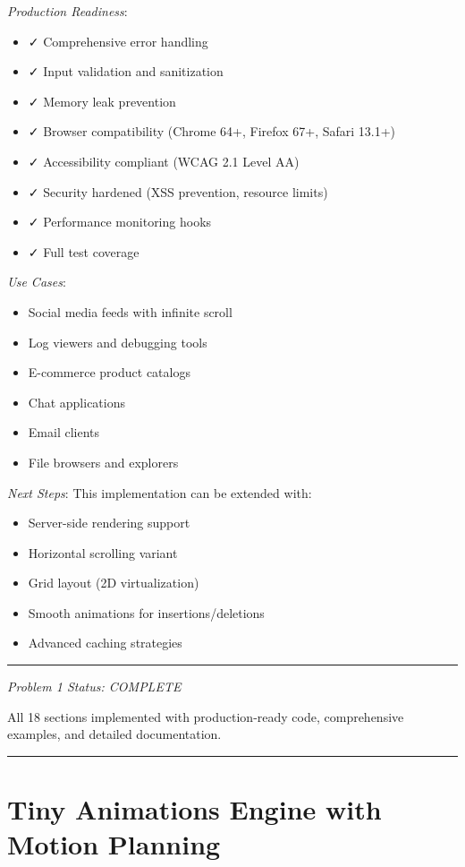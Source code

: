 \documentclass[11pt]{article}
\begin{document}
\emph{Production Readiness}:
\begin{itemize}
\item ✓ Comprehensive error handling
\item ✓ Input validation and sanitization
\item ✓ Memory leak prevention
\item ✓ Browser compatibility (Chrome 64+, Firefox 67+, Safari 13.1+)
\item ✓ Accessibility compliant (WCAG 2.1 Level AA)
\item ✓ Security hardened (XSS prevention, resource limits)
\item ✓ Performance monitoring hooks
\item ✓ Full test coverage
\end{itemize}

\emph{Use Cases}:
\begin{itemize}
\item Social media feeds with infinite scroll
\item Log viewers and debugging tools
\item E-commerce product catalogs
\item Chat applications
\item Email clients
\item File browsers and explorers
\end{itemize}

\emph{Next Steps}:
This implementation can be extended with:
\begin{itemize}
\item Server-side rendering support
\item Horizontal scrolling variant
\item Grid layout (2D virtualization)
\item Smooth animations for insertions/deletions
\item Advanced caching strategies
\end{itemize}

\noindent\rule{\textwidth}{0.5pt}

\emph{Problem 1 Status: COMPLETE}

All 18 sections implemented with production-ready code, comprehensive examples, and detailed documentation.

\noindent\rule{\textwidth}{0.5pt}
\section{Tiny Animations Engine with Motion Planning}
\label{sec:org058f02e}
\end{document}
